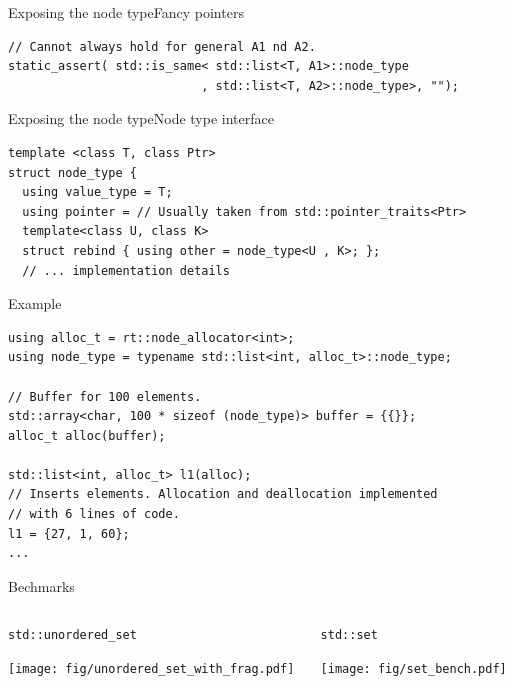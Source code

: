 \documentclass[10pt,aspectratio=169]{beamer}
\begin{document}
\begin{frame}[fragile]{Exposing the node type}{Fancy pointers}

\begin{lstlisting}
// Cannot always hold for general A1 nd A2.
static_assert( std::is_same< std::list<T, A1>::node_type
                           , std::list<T, A2>::node_type>, "");
\end{lstlisting}

\end{frame}

\begin{frame}[fragile]{Exposing the node type}{Node type interface}

\begin{lstlisting}
template <class T, class Ptr>
struct node_type {
  using value_type = T;
  using pointer = // Usually taken from std::pointer_traits<Ptr>
  template<class U, class K>
  struct rebind { using other = node_type<U , K>; };
  // ... implementation details
\end{lstlisting}

\end{frame}

\begin{frame}[fragile]{Example}

\begin{lstlisting}
using alloc_t = rt::node_allocator<int>;
using node_type = typename std::list<int, alloc_t>::node_type;

// Buffer for 100 elements.
std::array<char, 100 * sizeof (node_type)> buffer = {{}};
alloc_t alloc(buffer);

std::list<int, alloc_t> l1(alloc);
// Inserts elements. Allocation and deallocation implemented
// with 6 lines of code.
l1 = {27, 1, 60};
...
\end{lstlisting}

\end{frame}

\begin{frame}{Bechmarks}
    \begin{columns}
        \begin{column}{0.5\textwidth}
            \texttt{std::unordered\_set}
            \begin{center}
                \texttt{[image: fig/unordered\_set\_with\_frag.pdf]} \\
            \end{center}
        \end{column}

        \begin{column}{0.5\textwidth}
            \texttt{std::set}
            \begin{center}
                \texttt{[image: fig/set\_bench.pdf]} \\
            \end{center}
        \end{column}
    \end{columns}
\end{frame}
\end{document}
